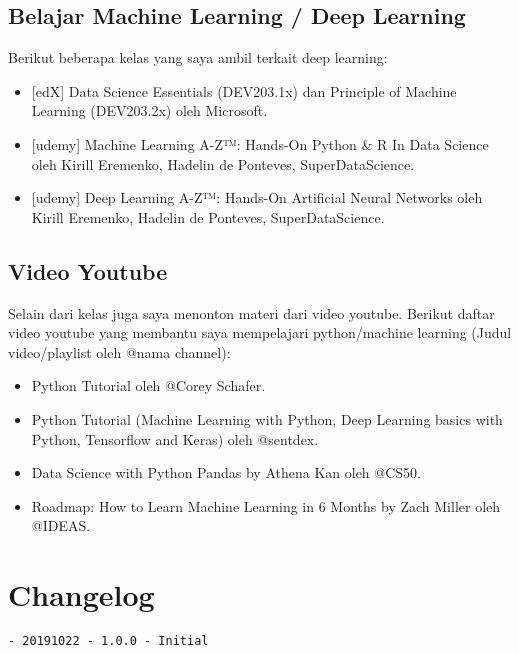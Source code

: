 \documentclass[11pt]{article}
\providecommand{\tightlist}{%
      \setlength{\itemsep}{0pt}\setlength{\parskip}{0pt}}
\begin{document}
    \hypertarget{belajar-machine-learning-deep-learning}{%
\subsection{Belajar Machine Learning / Deep
Learning}\label{belajar-machine-learning-deep-learning}}

Berikut beberapa kelas yang saya ambil terkait deep learning:

\begin{itemize}
\tightlist
\item
  {[}edX{]} Data Science Essentials (DEV203.1x) dan Principle of Machine
  Learning (DEV203.2x) oleh Microsoft.
\item
  {[}udemy{]} Machine Learning A-Z™: Hands-On Python \& R In Data
  Science oleh Kirill Eremenko, Hadelin de Ponteves, SuperDataScience.
\item
  {[}udemy{]} Deep Learning A-Z™: Hands-On Artificial Neural Networks
  oleh Kirill Eremenko, Hadelin de Ponteves, SuperDataScience.
\end{itemize}

    \hypertarget{video-youtube}{%
\subsection{Video Youtube}\label{video-youtube}}

Selain dari kelas juga saya menonton materi dari video youtube. Berikut
daftar video youtube yang membantu saya mempelajari python/machine
learning (Judul video/playlist oleh @nama channel):

\begin{itemize}
\tightlist
\item
  Python Tutorial oleh @Corey Schafer.
\item
  Python Tutorial (Machine Learning with Python, Deep Learning basics
  with Python, Tensorflow and Keras) oleh @sentdex.
\item
  Data Science with Python Pandas by Athena Kan oleh @CS50.
\item
  Roadmap: How to Learn Machine Learning in 6 Months by Zach Miller oleh
  @IDEAS.
\end{itemize}

    \hypertarget{changelog}{%
\section{Changelog}\label{changelog}}

\begin{verbatim}
- 20191022 - 1.0.0 - Initial
\end{verbatim}


    
    
    
\end{document}

